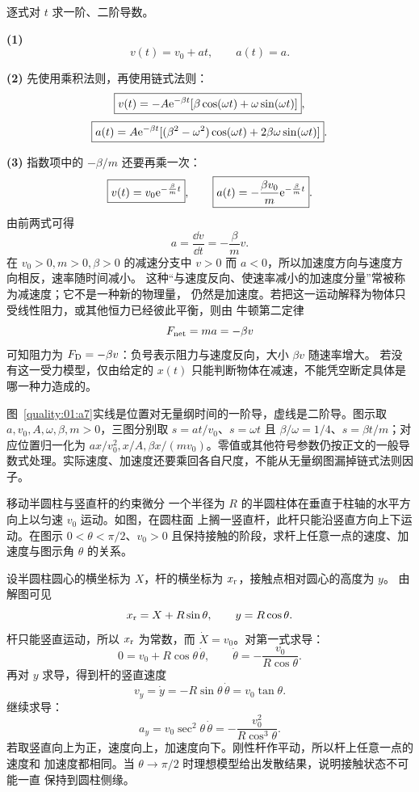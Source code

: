 {\begin{xesolution}
逐式对 $t$ 求一阶、二阶导数。

\textbf{(1)}
\[
 \boxed{v(t)=v_0+at},\qquad \boxed{a(t)=a}.
\]

\textbf{(2)} 先使用乘积法则，再使用链式法则：
\[
 \boxed{v(t)=-A\mathrm e^{-\beta t}
   [\beta\cos(\omega t)+\omega\sin(\omega t)]},
\]
\[
 \boxed{a(t)=A\mathrm e^{-\beta t}
   [(\beta^2-\omega^2)\cos(\omega t)
    +2\beta\omega\sin(\omega t)]}.
\]

\textbf{(3)} 指数项中的 $-\beta/m$ 还要再乘一次：
\[
 \boxed{v(t)=v_0\mathrm e^{-\frac{\beta}{m}t}},\qquad
 \boxed{a(t)=-\frac{\beta v_0}{m}\mathrm e^{-\frac{\beta}{m}t}}.
\]
由前两式可得
\[
 a=\frac{\dd v}{\dd t}=-\frac{\beta}{m}v.
\]
在 $v_0>0,m>0,\beta>0$ 的减速分支中 $v>0$ 而 $a<0$，所以加速度方向与速度方向相反，速率随时间减小。
这种“与速度反向、使速率减小的加速度分量”常被称为减速度；它不是一种新的物理量，
仍然是加速度。若把这一运动解释为物体只受线性阻力，或其他恒力已经彼此平衡，则由
牛顿第二定律
\[
 F_{\rm net}=ma=-\beta v
\]
可知阻力为 $F_{\rm D}=-\beta v$：负号表示阻力与速度反向，大小 $\beta v$ 随速率增大。
若没有这一受力模型，仅由给定的 $x(t)$ 只能判断物体在减速，不能凭空断定具体是哪一种力造成的。


图~\ref{quality:01:a7}实线是位置对无量纲时间的一阶导，虚线是二阶导。图示取 $a,v_0,A,\omega,\beta,m>0$，三图分别取 $s=at/v_0$、$s=\omega t$ 且 $\beta/\omega=1/4$、$s=\beta t/m$；对应位置归一化为 $ax/v_0^2,x/A,\beta x/(mv_0)$。零值或其他符号参数仍按正文的一般导数式处理。实际速度、加速度还要乘回各自尺度，不能从无量纲图漏掉链式法则因子。
\end{xesolution}

\begin{origexamplebox}{移动半圆柱与竖直杆的约束微分}\label{ch01:ex:s14-1-4}
一个半径为 $R$ 的半圆柱体在垂直于柱轴的水平方向上以匀速 $v_0$ 运动。如图，在圆柱面
上搁一竖直杆，此杆只能沿竖直方向上下运动。在图示 $0<\theta<\pi/2$、$v_0>0$ 且保持接触的阶段，求杆上任意一点的速度、加速度与图示角
$\theta$ 的关系。
\end{origexamplebox}

\begin{xesolution}
设半圆柱圆心的横坐标为 $X$，杆的横坐标为 $x_{\rm r}$，接触点相对圆心的高度为 $y$。
由解图可见
\[
 x_{\rm r}=X+R\sin\theta,\qquad y=R\cos\theta.
\]
杆只能竖直运动，所以 $x_{\rm r}$ 为常数，而 $\dot X=v_0$。对第一式求导：
\[
 0=v_0+R\cos\theta\,\dot\theta,\qquad
 \dot\theta=-\frac{v_0}{R\cos\theta}.
\]
再对 $y$ 求导，得到杆的竖直速度
\[
 v_y=\dot y=-R\sin\theta\,\dot\theta
 =\boxed{v_0\tan\theta}.
\]
继续求导：
\[
 a_y=v_0\sec^2\theta\,\dot\theta
 =\boxed{-\frac{v_0^2}{R\cos^3\theta}}.
\]
若取竖直向上为正，速度向上，加速度向下。刚性杆作平动，所以杆上任意一点的速度和
加速度都相同。当 $\theta\to\pi/2$ 时理想模型给出发散结果，说明接触状态不可能一直
保持到圆柱侧缘。


\end{xesolution}}
